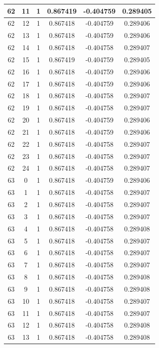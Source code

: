 \documentclass[12pt,a4paper]{article}
\numberwithin{equation}{section}
\numberwithin{figure}{section}
\numberwithin{table}{section}
\begin{document}
\begin{longtable}{|c|c|c|c|c|c|}
62 & 11 & 1 & 0.867419 & -0.404759 & 0.289405 \\ \hline
62 & 12 & 1 & 0.867418 & -0.404759 & 0.289406 \\ \hline
62 & 13 & 1 & 0.867418 & -0.404759 & 0.289406 \\ \hline
62 & 14 & 1 & 0.867418 & -0.404758 & 0.289407 \\ \hline
62 & 15 & 1 & 0.867419 & -0.404759 & 0.289405 \\ \hline
62 & 16 & 1 & 0.867418 & -0.404759 & 0.289406 \\ \hline
62 & 17 & 1 & 0.867418 & -0.404759 & 0.289406 \\ \hline
62 & 18 & 1 & 0.867418 & -0.404758 & 0.289407 \\ \hline
62 & 19 & 1 & 0.867418 & -0.404758 & 0.289407 \\ \hline
62 & 20 & 1 & 0.867418 & -0.404759 & 0.289406 \\ \hline
62 & 21 & 1 & 0.867418 & -0.404759 & 0.289406 \\ \hline
62 & 22 & 1 & 0.867418 & -0.404758 & 0.289407 \\ \hline
62 & 23 & 1 & 0.867418 & -0.404758 & 0.289407 \\ \hline
62 & 24 & 1 & 0.867418 & -0.404758 & 0.289407 \\ \hline
63 & 0 & 1 & 0.867418 & -0.404759 & 0.289406 \\ \hline
63 & 1 & 1 & 0.867418 & -0.404758 & 0.289407 \\ \hline
63 & 2 & 1 & 0.867418 & -0.404758 & 0.289407 \\ \hline
63 & 3 & 1 & 0.867418 & -0.404758 & 0.289407 \\ \hline
63 & 4 & 1 & 0.867418 & -0.404758 & 0.289408 \\ \hline
63 & 5 & 1 & 0.867418 & -0.404758 & 0.289407 \\ \hline
63 & 6 & 1 & 0.867418 & -0.404758 & 0.289407 \\ \hline
63 & 7 & 1 & 0.867418 & -0.404758 & 0.289407 \\ \hline
63 & 8 & 1 & 0.867418 & -0.404758 & 0.289408 \\ \hline
63 & 9 & 1 & 0.867418 & -0.404758 & 0.289408 \\ \hline
63 & 10 & 1 & 0.867418 & -0.404758 & 0.289407 \\ \hline
63 & 11 & 1 & 0.867418 & -0.404758 & 0.289407 \\ \hline
63 & 12 & 1 & 0.867418 & -0.404758 & 0.289408 \\ \hline
63 & 13 & 1 & 0.867418 & -0.404758 & 0.289408 \\ \hline

\end{longtable}
\end{document}
